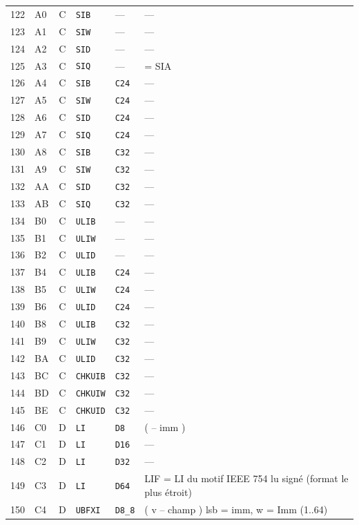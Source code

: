 \documentclass[10pt,a4paper,twoside,openany]{book}
\begin{document}
\begin{landscape}
\begin{longtable}{@{}r l c l l p{10.7cm}@{}}
122 & A0 & C & \texttt{SIB} & --- & ---\\
123 & A1 & C & \texttt{SIW} & --- & ---\\
124 & A2 & C & \texttt{SID} & --- & ---\\
125 & A3 & C & \texttt{SIQ} & --- & = SIA\\
126 & A4 & C & \texttt{SIB} & \texttt{C24} & ---\\
127 & A5 & C & \texttt{SIW} & \texttt{C24} & ---\\
128 & A6 & C & \texttt{SID} & \texttt{C24} & ---\\
129 & A7 & C & \texttt{SIQ} & \texttt{C24} & ---\\
130 & A8 & C & \texttt{SIB} & \texttt{C32} & ---\\
131 & A9 & C & \texttt{SIW} & \texttt{C32} & ---\\
132 & AA & C & \texttt{SID} & \texttt{C32} & ---\\
133 & AB & C & \texttt{SIQ} & \texttt{C32} & ---\\
134 & B0 & C & \texttt{ULIB} & --- & ---\\
135 & B1 & C & \texttt{ULIW} & --- & ---\\
136 & B2 & C & \texttt{ULID} & --- & ---\\
137 & B4 & C & \texttt{ULIB} & \texttt{C24} & ---\\
138 & B5 & C & \texttt{ULIW} & \texttt{C24} & ---\\
139 & B6 & C & \texttt{ULID} & \texttt{C24} & ---\\
140 & B8 & C & \texttt{ULIB} & \texttt{C32} & ---\\
141 & B9 & C & \texttt{ULIW} & \texttt{C32} & ---\\
142 & BA & C & \texttt{ULID} & \texttt{C32} & ---\\
143 & BC & C & \texttt{CHKUIB} & \texttt{C32} & ---\\
144 & BD & C & \texttt{CHKUIW} & \texttt{C32} & ---\\
145 & BE & C & \texttt{CHKUID} & \texttt{C32} & ---\\
146 & C0 & D & \texttt{LI} & \texttt{D8} & ( -- imm )\\
147 & C1 & D & \texttt{LI} & \texttt{D16} & ---\\
148 & C2 & D & \texttt{LI} & \texttt{D32} & ---\\
149 & C3 & D & \texttt{LI} & \texttt{D64} & LIF = LI du motif IEEE 754 lu signé (format le plus étroit)\\
150 & C4 & D & \texttt{UBFXI} & \texttt{D8\_8} & ( v -- champ )		lsb = imm, w = Imm (1..64)\\

\end{longtable}
\end{landscape}
\end{document}
